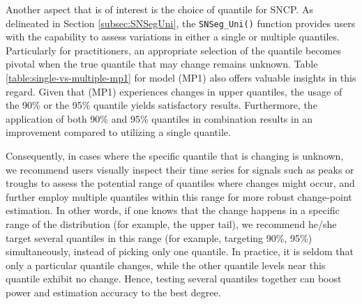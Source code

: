 
{Another aspect that is of interest is the choice of quantile for SNCP. As delineated in Section \ref{subsec:SNSegUni}, the \texttt{SNSeg\_Uni()} function provides users with the capability to assess variations in either a single or multiple quantiles. Particularly for practitioners, an appropriate selection of the quantile becomes pivotal when the true quantile that may change remains unknown. Table \ref{table:single-vs-multiple-mp1} for model (MP1) also offers valuable insights in this regard. Given that (MP1) experiences changes in upper quantiles, the usage of the 90\% or the 95\% quantile yields satisfactory results. Furthermore, the application of both 90\% and 95\% quantiles in combination results in an improvement compared to utilizing a single quantile.}

{Consequently, in cases where the specific quantile that is changing is unknown, we recommend users visually inspect their time series for signals such as peaks or troughs to assess the potential range of quantiles where changes might occur, and further employ multiple quantiles within this range for more robust change-point estimation. In other words, if one knows that the change happens in a specific range of the distribution (for example, the upper tail), we recommend he/she target several quantiles in this range (for example, targeting 90\%, 95\%) simultaneously, instead of picking only one quantile. In practice, it is seldom that only a particular quantile changes, while the other quantile levels near this quantile exhibit no change. Hence, testing several quantiles together can boost power and estimation accuracy to the best degree.}





